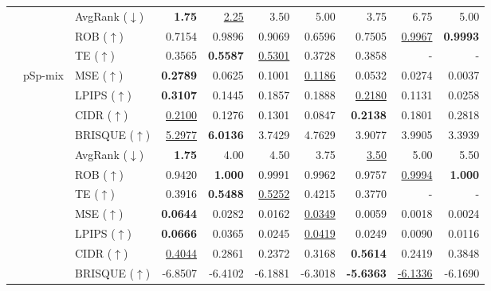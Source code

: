 \documentclass{article}
\begin{document}
\begin{table}[h!]
\begin{tabular}{lllrrrrrrr}
& & AvgRank ($\downarrow$) & \textbf{1.75} & \underline{2.25} & 3.50 & 5.00 & 3.75 & 6.75 & 5.00 \\

\cmidrule(lr){3-10}

& & ROB ($\uparrow$) & 0.7154 & 0.9896 & 0.9069 & 0.6596 & 0.7505 & \underline{0.9967} & \textbf{0.9993} \\
& & TE ($\uparrow$) & 0.3565 & \textbf{0.5587} & \underline{0.5301} & 0.3728 & 0.3858 & - & -\\
\cmidrule(lr){2-10}

& \multirow{9}{*}{pSp-mix}
& MSE ($\uparrow$) & \textbf{0.2789} & 0.0625 & 0.1001 & \underline{0.1186} & 0.0532 & 0.0274 & 0.0037 \\
& & LPIPS ($\uparrow$) & \textbf{0.3107} & 0.1445 & 0.1857 & 0.1888 & \underline{0.2180} & 0.1131 & 0.0258 \\
& & CIDR ($\uparrow$) & \underline{0.2100} & 0.1276 & 0.1301 & 0.0847 & \textbf{0.2138} & 0.1801 & 0.2818 \\
& & BRISQUE ($\uparrow$) & \underline{5.2977} & \textbf{6.0136} & 3.7429 & 4.7629 & 3.9077 & 3.9905 & 3.3939 \\
\cmidrule(lr){3-10}

& & AvgRank ($\downarrow$) & \textbf{1.75} & 4.00 & 4.50 & 3.75 & \underline{3.50} & 5.00 & 5.50 \\

\cmidrule(lr){3-10}

& & ROB ($\uparrow$) & 0.9420 & \textbf{1.000} & 0.9991 & 0.9962 & 0.9757 & \underline{0.9994} & \textbf{1.000} \\
& & TE ($\uparrow$) & 0.3916 & \textbf{0.5488} & \underline{0.5252} & 0.4215 & 0.3770 & - & -\\

\cmidrule(lr){2-10}

& \multirow{9}{*}{BlendFace}
& MSE ($\uparrow$) & \textbf{0.0644} & 0.0282 & 0.0162 & \underline{0.0349} & 0.0059 & 0.0018 & 0.0024 \\
& & LPIPS ($\uparrow$) & \textbf{0.0666} & 0.0365 & 0.0245 & \underline{0.0419} & 0.0249 & 0.0090 & 0.0116 \\
& & CIDR ($\uparrow$) & \underline{0.4044} & 0.2861 & 0.2372 & 0.3168 & \textbf{0.5614} & 0.2419 & 0.3848\\
& & BRISQUE ($\uparrow$) & -6.8507 & -6.4102 & -6.1881 & -6.3018 & \textbf{-5.6363} & \underline{-6.1336} & -6.1690 \\
\cmidrule(lr){3-10}


\end{tabular}
\end{table}
\end{document}
